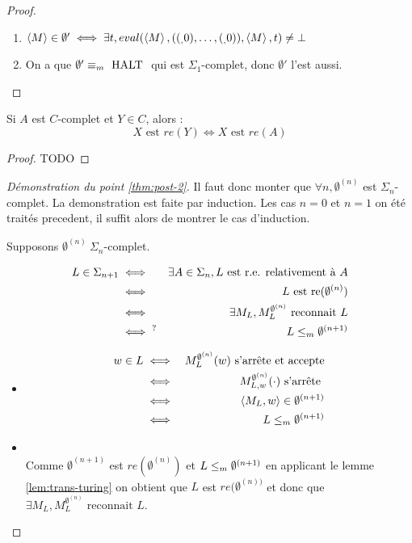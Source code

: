 \begin{proof}
	\begin{enumerate}
		\item $\left\langle M\right\rangle \in \emptyset' \iff \exists t, eval (\left\langle M\right\rangle, ((_,0), \ldots, (_,0)), \left\langle M\right\rangle, t) \neq \bot$
		\item On a que $\emptyset' \equiv_m \text{ HALT }$ qui est $\Sigma_1$-complet, donc $\emptyset'$ l'est aussi.
	\end{enumerate}
\end{proof}


\begin{lemma} \label{lem:trans-turing}
	Si $A$ est $C$-complet et $Y \in C$, alors :
	$$X \text{ est } re(Y) \iff X \text{ est } re(A)$$
\end{lemma}

\begin{proof}
	TODO
\end{proof}


\begin{proof}[Démonstration du point \ref{thm:post-2}]
	Il faut donc monter que $\forall n, \emptyset^{(n)}$ est $\Sigma_n$-complet.
	La demonstration est faite par induction. Les cas $n =0$ et $n=1$ on été traités precedent, il suffit alors de montrer le cas d'induction.

	Supposons $\emptyset^{(n)} \ \Sigma_n$-complet.

	\begin{eqnarray*}
		L \in \Sigma_{n+1} &\iff& \exists A \in \Sigma_n, L \text { est r.e. relativement à } A \\
		&\iff& L \text{ est re}(\emptyset^{(n)})\\
		&\iff& \exists M_L, M_L^{\emptyset^{(n)}} \text { reconnait } L \\
		&\iff^? & L \leq_m \emptyset^{(n + 1)}
	\end{eqnarray*}

	\begin{itemize}
		\item \bimpLR
		      \begin{eqnarray*}
			      w \in  L  &\iff&  M_L^{\emptyset^{(n)}}(w) \text{ s'arrête et accepte} \\
			      &\iff&  M_{L,w}^{\emptyset^{(n)}}(\cdot) \text{ s'arrête } \\
			      &\iff&  \left\langle M_L,w\right\rangle \in \emptyset^{(n+1)} \\
			      &\iff&  L \leq_m  \emptyset^{(n+1)}
		      \end{eqnarray*}
		\item \bimpRL \\
		      Comme $\emptyset^{(n+1)}$ est $re(\emptyset^{(n)})$ et $L \leq_m \emptyset^{(n+1)}$ en applicant le lemme \ref{lem:trans-turing}
		      on obtient que $L$ est $re(\emptyset^{(n))}$ et donc que $\exists M_L, M_L^{\emptyset^{(n)}} \text { reconnait } L$.
	\end{itemize}
\end{proof}



